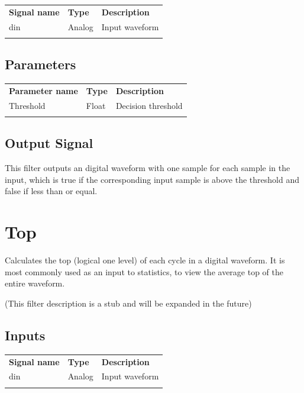 \begin{tabularx}{16cm}{llX}
\thickhline
\textbf{Signal name} & \textbf{Type} & \textbf{Description} \\
\thickhline
din & Analog & Input waveform \\
\thickhline
\end{tabularx}

\subsection{Parameters}

\begin{tabularx}{16cm}{llX}
\thickhline
\textbf{Parameter name} & \textbf{Type} & \textbf{Description} \\
\thickhline
Threshold & Float & Decision threshold \\
\thickhline
\end{tabularx}

\subsection{Output Signal}

This filter outputs an digital waveform with one sample for each sample in the input, which is true if the
corresponding input sample is above the threshold and false if less than or equal.

\pagebreak
\section{Top}

Calculates the top (logical one level) of each cycle in a digital waveform. It is most commonly used as an input to
statistics, to view the average top of the entire waveform.

(This filter description is a stub and will be expanded in the future)

\subsection{Inputs}

\begin{tabularx}{16cm}{llX}
\thickhline
\textbf{Signal name} & \textbf{Type} & \textbf{Description} \\
\thickhline
din & Analog & Input waveform \\
\thickhline
\end{tabularx}

